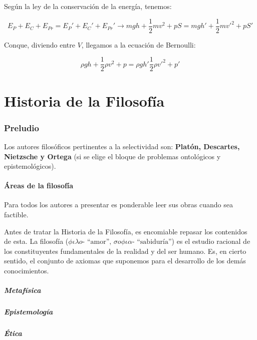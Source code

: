 \documentclass[10pt]{article}
\begin{document}
Según la ley de la conservación de la energía, tenemos:

\[ E_P + E_C + E_{Pr} = E_P' + E_C' + E_{Pr}' \to mgh + \frac{1}{2}mv^2 + pS = mgh' + \frac{1}{2}mv'^2 + pS' \]

Conque, diviendo entre $ V $, llegamos a la ecuación de Bernoulli:

\[ \rho gh + \frac{1}{2} \rho v^2 + p = \rho gh' \frac{1}{2} \rho v'^2 + p' \]

\newpage

\part{Historia de la Filosofía}

\section{Preludio}

Los autores filosóficos pertinentes a la selectividad son: \textbf{Platón, Descartes, Nietzsche y Ortega} (si se elige el bloque
de problemas ontológicos y epistemológicos).

\subsection{Áreas de la filosofía}

Para todos los autores a presentar es ponderable leer sus obras cuando sea factible.

Antes de tratar la Historia de la Filosofía, es encomiable repasar los contenidos de esta. La filosofía ($ \phi \iota \lambda o \text{- ``amor'', } \sigma o \phi \iota \alpha \text{- ``sabiduría''} $)
es el estudio racional de los constituyentes fundamentales de la realidad y del ser humano. Es, en cierto sentido, el conjunto de axiomas que suponemos para el desarrollo de los demás conocimientos.

\subsubsection{Metafísica}

\subsubsection{Epistemología}

\subsubsection{Ética}
\end{document}
